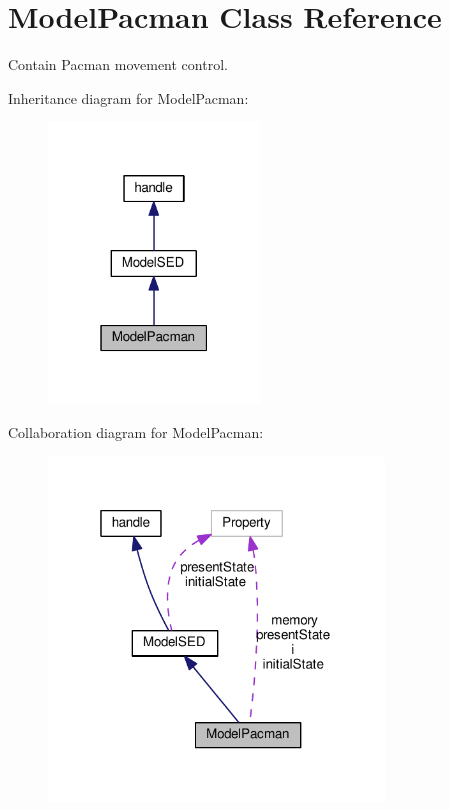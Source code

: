 \hypertarget{class_model_pacman}{}\section{Model\+Pacman Class Reference}
\label{class_model_pacman}


Contain Pacman movement control.  




Inheritance diagram for Model\+Pacman\+:\nopagebreak
\begin{figure}[H]
\begin{center}
\leavevmode
\includegraphics[width=159pt]{class_model_pacman__inherit__graph}
\end{center}
\end{figure}


Collaboration diagram for Model\+Pacman\+:\nopagebreak
\begin{figure}[H]
\begin{center}
\leavevmode
\includegraphics[width=253pt]{class_model_pacman__coll__graph}
\end{center}
\end{figure}

